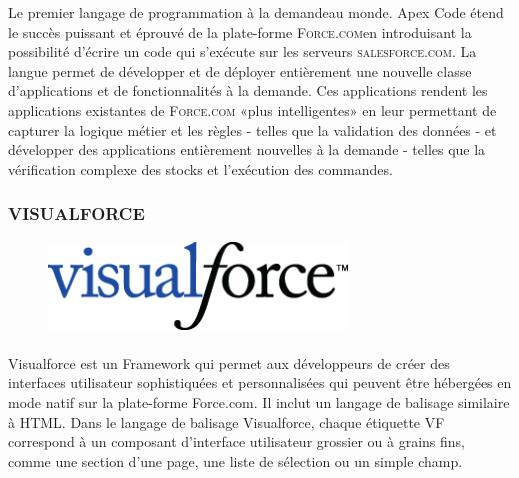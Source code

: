 \documentclass[a4paper, 12pt]{report}
\begin{document}
\begin{itemize}
Le premier langage de programmation à la demande\footnotemark[2] au monde. Apex Code étend le succès puissant et éprouvé de la plate-forme \textsc{Force.com}\footnotemark[3] en introduisant la possibilité d'écrire un code qui s'exécute sur les serveurs \textsc{salesforce.com}. La langue permet de développer et de déployer entièrement une nouvelle classe d'applications et de fonctionnalités à la demande. Ces applications rendent les applications existantes de \textsc{Force.com} «plus intelligentes» en leur permettant de capturer la logique métier et les règles - telles que la validation des données - et développer des applications entièrement nouvelles à la demande - telles que la vérification complexe des stocks et l'exécution des commandes.




\subsubsection{VISUALFORCE}
\begin{figure}[H]
	\centering
		\includegraphics{Visualforce.jpg}
	\label{fig:Visualforce}
\end{figure}

\paragraph{}
Visualforce est un Framework qui permet aux développeurs de créer des interfaces utilisateur sophistiquées et personnalisées qui peuvent être hébergées en mode natif sur la plate-forme Force.com. Il inclut un langage de balisage similaire à HTML.
Dans le langage de balisage Visualforce, chaque étiquette VF correspond à un composant d'interface utilisateur grossier ou à grains fins, comme une section d'une page, une liste de sélection ou un simple champ. 

\end{itemize}
\end{document}
